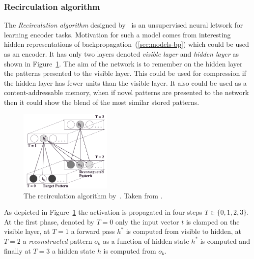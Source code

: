 \subsubsection{Recirculation algorithm}
\label{sec:models-recirc} 

The \emph{Recirculation algorithm} designed by~\citet{hinton1988learning} is an unsupervised neural letwork for learning encoder tasks. Motivation for such a model comes from interesting hidden representations of backpropagation~(\ref{sec:models-bp}) which could be used as an encoder. It has only two layers denoted \emph{visible layer} and \emph{hidden layer} as shown in Figure~\ref{fig:models-recirc}. The aim of the network is to remember on the hidden layer the patterns presented to the visible layer. This could be used for compression if the hidden layer has fewer units than the visible layer. It also could be used as a content-addressable memory, when if novel patterns are presented to the network then it could show the blend of the most similar stored patterns. 

\begin{figure}[H]
  \centering
\includegraphics[width=0.4\textwidth]{img/recirculation.png}
  \caption{The recirculation algorithm by~\citet{hinton1988learning}. Taken from \citep{o1996bio}.}
  \label{fig:models-recirc}
\end{figure}

As depicted in Figure~\ref{fig:models-recirc} the activation is propagated in four steps $T \in \{0,1,2,3\}$. At the first phase, denoted by $T=0$ only the input vector $t$ is clamped on the visible layer, at $T=1$ a forward pass $h^{*}$ is computed from visible to hidden, at $T=2$ a \emph{reconstructed} pattern $o_k$ as a function of hidden state $h^{*}$ is computed and finally at $T=3$ a hidden state $h$ is computed from $o_k$.

